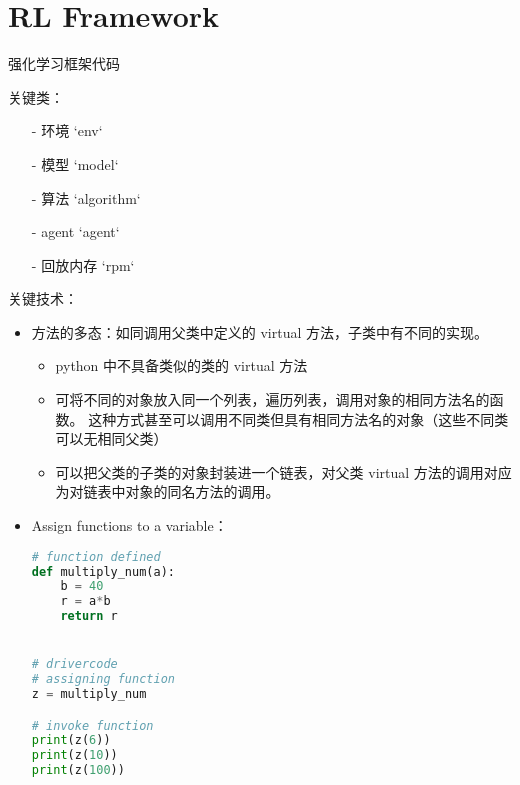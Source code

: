 \chapter{RL Framework}

强化学习框架代码

关键类：
\begin{itemize}
\item[-]
环境 `env`

\item[-]
模型 `model`

\item[-]
算法 `algorithm`

\item[-]
agent `agent`

\item[-]
回放内存 `rpm`
\end{itemize}


关键技术：
\begin{itemize}
\item
方法的多态：如同调用父类中定义的 virtual 方法，子类中有不同的实现。
	\begin{itemize}
	\item
	python 中不具备类似的类的 virtual 方法

	\item
	可将不同的对象放入同一个列表，遍历列表，调用对象的相同方法名的函数。
	这种方式甚至可以调用不同类但具有相同方法名的对象（这些不同类可以无相同父类）

	\item
	可以把父类的子类的对象封装进一个链表，对父类 virtual 方法的调用对应为对链表中对象的同名方法的调用。
	\end{itemize}

\item
Assign functions to a variable：
\begin{lstlisting}[language=Python]
# function defined
def multiply_num(a):
	b = 40
	r = a*b
	return r


# drivercode
# assigning function
z = multiply_num

# invoke function
print(z(6))
print(z(10))
print(z(100))
\end{lstlisting}

\end{itemize}

